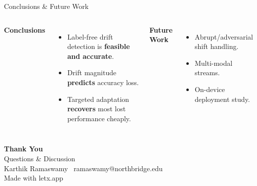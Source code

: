 \documentclass[aspectratio=169,11pt]{beamer}
\begin{document}

\begin{frame}{Conclusions \& Future Work}
  \begin{columns}[T]
      \textbf{Conclusions}
      \begin{itemize}
        \item Label-free drift detection is \textbf{feasible and accurate}.
        \item Drift magnitude \textbf{predicts} accuracy loss.
        \item Targeted adaptation \textbf{recovers} most lost performance cheaply.
      \end{itemize}
      \textbf{Future Work}
      \begin{itemize}
        \item Abrupt/adversarial shift handling.
        \item Multi-modal streams.
        \item On-device deployment study.
      \end{itemize}
  \end{columns}
\end{frame}

{
\begin{frame}
  \vfill\centering
  {\color{white}\Huge\bfseries Thank You}\\[10pt]
  {\color{accent2}\large Questions \& Discussion}\\[16pt]
  {\color{light}\small Karthik Ramaswamy \textbullet\ ramaswamy@northbridge.edu}\\[4pt]
  {\color{mist}\footnotesize Made with letx.app}
  \vfill
\end{frame}}
\end{document}
